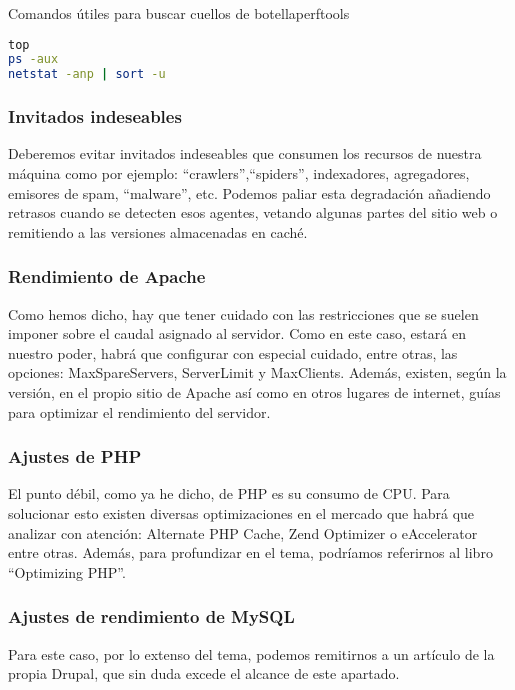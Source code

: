 \begin{codigo}{Comandos útiles para buscar cuellos de botella}{perftools}
\begin{lstlisting}[language=bash,frame=single]
top
ps -aux
netstat -anp | sort -u
\end{lstlisting}
\end{codigo}

\subsubsection{Invitados indeseables}
\par Deberemos evitar invitados indeseables que consumen los recursos de nuestra máquina como por ejemplo: ``crawlers'',``spiders'', indexadores, agregadores, emisores de spam, ``malware'', etc.
Podemos paliar esta degradación añadiendo retrasos cuando se detecten esos agentes, vetando algunas partes del sitio web o remitiendo a las versiones almacenadas en caché.

\subsubsection{Rendimiento de Apache}
\par Como hemos dicho, hay que tener cuidado con las restricciones que se suelen imponer sobre el caudal asignado al servidor. Como en este caso, estará en nuestro poder, habrá que configurar con especial cuidado, entre otras, las opciones: MaxSpareServers, ServerLimit y MaxClients. Además, existen, según la versión, en el propio sitio de Apache así como en otros lugares de internet, guías para optimizar el rendimiento del servidor\cite{references:apachedocs}.

\subsubsection{Ajustes de PHP}
\par El punto débil, como ya he dicho, de PHP es su consumo de CPU. Para solucionar esto existen diversas optimizaciones en el mercado que habrá que analizar con atención: Alternate PHP Cache, Zend Optimizer\cite{references:drupalzend} o eAccelerator entre otras. Además, para profundizar en el tema, podríamos referirnos al libro ``Optimizing PHP''\cite{references:optimizingphp}.

\subsubsection{Ajustes de rendimiento de MySQL}
\par Para este caso, por lo extenso del tema, podemos remitirnos a un artículo de la propia Drupal\cite{references:tuningmysql}, que sin duda excede el alcance de este apartado.

